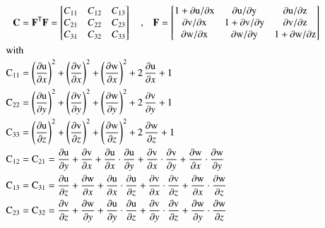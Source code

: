 \begin{subequations}
	\begin{align}
	\mathbf{C} &= \mathbf{F}^{\mathsf{T}} \mathbf{F} =
	\begin{bmatrix}
	C_{11} & C_{12} & C_{13} \\
	C_{21} & C_{22} & C_{23} \\
	C_{31} & C_{32} & C_{33}
	\end{bmatrix} \quad \textrm{,} \quad
	\mathbf{F} =  
	\begin{bmatrix}
	1 + \mathrm{\partial u / \partial x} & \mathrm{\partial u / \partial y} & \mathrm{\partial u / \partial z} \\
	\mathrm{\partial v / \partial x} & 1 + \mathrm{\partial v / \partial y} & \mathrm{\partial v / \partial z} \\
	\mathrm{\partial w / \partial x} & \mathrm{\partial w / \partial y} & 1 + \mathrm{\partial w / \partial z}
	\end{bmatrix}\\
	\intertext{with}
	\mathrm{C_{11}} & = \left(\frac{\mathrm{\partial u}}{\partial x}\right)^2 + \left(\frac{\mathrm{\partial v}}{\partial x}\right)^2 + \left(\frac{\mathrm{\partial w}}{\partial x}\right)^2 + 2\, \frac{\mathrm{\partial u}}{\partial x}  + 1\\
	\mathrm{C_{22}} & = \left(\frac{\mathrm{\partial u}}{\partial y}\right)^2 + \left(\frac{\mathrm{\partial v}}{\partial y}\right)^2 + \left(\frac{\mathrm{\partial w}}{\partial y}\right)^2 + 2\, \frac{\mathrm{\partial v}}{\partial y} + 1\\
	\mathrm{C_{33}} & = \left(\frac{\mathrm{\partial u}}{\partial z}\right)^2 + \left(\frac{\mathrm{\partial v}}{\partial z}\right)^2 + \left(\frac{\mathrm{\partial w}}{\partial z}\right)^2 + 2\, \frac{\mathrm{\partial w}}{\partial z} + 1 \\
	\mathrm{C_{12}} & = \mathrm{C_{21}} = \frac{\mathrm{\partial u}}{\partial y} + \frac{\mathrm{\partial v}}{\partial x} + \frac{\mathrm{\partial u}}{\partial x} \cdot \frac{\mathrm{\partial u}}{\partial y} + \frac{\mathrm{\partial v}}{\partial x} \cdot \frac{\mathrm{\partial v}}{\partial y} + \frac{\mathrm{\partial w}}{\partial x} \cdot \frac{\mathrm{\partial w}}{\partial y}\\
	\mathrm{C_{13}} & = \mathrm{C_{31}} = \frac{\mathrm{\partial u}}{\partial z} + \frac{\mathrm{\partial w}}{\partial x} + \frac{\mathrm{\partial u}}{\partial x} \cdot \frac{\mathrm{\partial u}}{\partial z} + \frac{\mathrm{\partial v}}{\partial x} \cdot \frac{\mathrm{\partial v}}{\partial z} + \frac{\mathrm{\partial w}}{\partial x} \cdot \frac{\mathrm{\partial w}}{\partial z} \\
	\mathrm{C_{23}} & = \mathrm{C_{32}} = \frac{\mathrm{\partial v}}{\partial z} + \frac{\mathrm{\partial w}}{\partial y} + \frac{\mathrm{\partial u}}{\partial y} \cdot \frac{\mathrm{\partial u}}{\partial z} + \frac{\mathrm{\partial v}}{\partial y} \cdot \frac{\mathrm{\partial v}}{\partial z} + \frac{\mathrm{\partial w}}{\partial y} \cdot \frac{\mathrm{\partial w}}{\partial z}
	\end{align}
\end{subequations}
